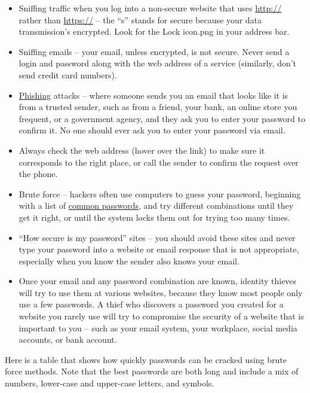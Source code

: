 \documentclass[
]{book}
\providecommand{\tightlist}{%
  \setlength{\itemsep}{0pt}\setlength{\parskip}{0pt}}
\theoremstyle{definition}
\theoremstyle{definition}
\theoremstyle{definition}
\theoremstyle{definition}
\theoremstyle{remark}
\begin{document}
\begin{itemize}
\tightlist
\item
  Sniffing traffic when you log into a non-secure website that uses \url{http://} rather than \url{https://} -- the ``s'' stands for secure because your data transmission's encrypted. Look for the Lock icon.png in your address bar.\\
\item
  Sniffing emails -- your email, unless encrypted, is not secure. Never send a login and password along with the web address of a service (similarly, don't send credit card numbers).\\
\item
  \href{https://en.wikipedia.org/wiki/Phishing}{Phishing} attacks -- where someone sends you an email that looks like it is from a trusted sender, such as from a friend, your bank, an online store you frequent, or a government agency, and they ask you to enter your password to confirm it. No one should ever ask you to enter your password via email.\\
\item
  Always check the web address (hover over the link) to make sure it corresponds to the right place, or call the sender to confirm the request over the phone.\\
\item
  Brute force -- hackers often use computers to guess your password, beginning with a list of \href{https://www.passwordrandom.com/most-popular-passwords}{common passwords}, and try different combinations until they get it right, or until the system locks them out for trying too many times.\\
\item
  ``How secure is my password'' sites -- you should avoid these sites and never type your password into a website or email response that is not appropriate, especially when you know the sender also knows your email.\\
\item
  Once your email and any password combination are known, identity thieves will try to use them at various websites, because they know most people only use a few passwords. A thief who discovers a password you created for a website you rarely use will try to compromise the security of a website that is important to you -- such as your email system, your workplace, social media accounts, or bank account.
\end{itemize}

Here is a table that shows how quickly passwords can be cracked using brute force methods. Note that the best passwords are both long and include a mix of numbers, lower-case and upper-case letters, and symbols.
\end{document}
